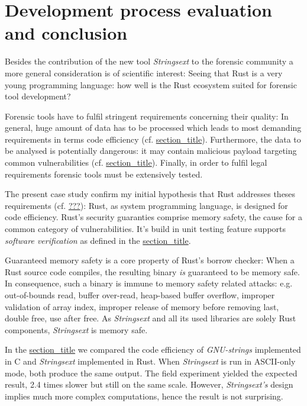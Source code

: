\section{Development process evaluation and
conclusion}\label{_development_process_evaluation_and_conclusion}

Besides the contribution of the new tool \emph{Strings­ext} to the
forensic community a more general consideration is of scientific
interest: Seeing that Rust is a very young programming language: how
well is the Rust ecosystem suited for forensic tool development?

Forensic tools have to fulfil stringent requirements concerning their
quality: In general, huge amount of data has to be processed which leads
to most demanding requirements in terms code efficiency (cf.
\protect\hyperlink{_code_efficiency}{section\_title}). Furthermore, the
data to be analysed is potentially dangerous: it may contain malicious
payload targeting common vulnerabilities (cf.
\protect\hyperlink{security1}{section\_title}). Finally, in order to
fulfil legal requirements forensic tools must be extensively tested.

The present case study confirm my initial hypothesis that Rust addresses
theses requirements (cf. \protect\hyperlink{rust}{???}): Rust, as system
programming language, is designed for code efficiency. Rust's security
guaranties comprise memory safety, the cause for a common category of
vulnerabilities. It's build in unit testing feature supports
\emph{software verification} as defined in the
\protect\hyperlink{_tool_validation}{section\_title}.

Guaranteed memory safety is a core property of Rust's borrow checker:
When a Rust source code compiles, the resulting binary \emph{is}
guaranteed to be memory safe. In consequence, such a binary is immune to
memory safety related attacks: e.g. out-of-bounds read, buffer
over-read, heap-based buffer overflow, improper validation of array
index, improper release of memory before removing last, double free, use
after free. As \emph{Strings­ext} and all its used libraries are solely
Rust components, \emph{Strings­ext} is memory safe.

In the
\protect\hyperlink{_benchmarking_and_field_experiment}{section\_title}
we compared the code efficiency of \emph{GNU-strings} implemented in C
and \emph{Strings­ext} implemented in Rust. When \emph{Strings­ext} is
run in ASCII-only mode, both produce the same output. The field
experiment yielded the expected result, 2.4 times slower but still on
the same scale. However, \emph{Stringsext's} design implies much more
complex computations, hence the result is not surprising.

